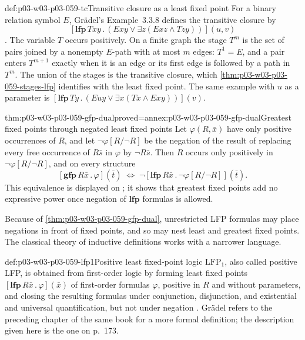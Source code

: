 \begin{hbexample}{def:p03-w03-p03-059-tc}{Transitive closure as a least fixed point}
For a binary relation symbol \(E\), Gr\"adel's Example~3.3.8 defines the
transitive closure by
\[
 [\mathbf{lfp}\,Txy\,.\,(Exy\lor\exists z(Exz\land Tzy))](u,v)
\]
\cite[p.~155]{Gradel2007FMTDescriptiveChapter}. The variable \(T\) occurs positively. On a
finite graph the stage \(T^m\) is the set of pairs joined by a nonempty
\(E\)-path with at most \(m\) edges: \(T^1=E\), and a pair enters
\(T^{m+1}\) exactly when it is an edge or its first edge is followed by a
path in \(T^m\). The union of the stages is the transitive closure, which
\cref{thm:p03-w03-p03-059-stages-lfp} identifies with the least fixed
point. The same example with \(u\) as a parameter is
\([\mathbf{lfp}\,Ty\,.\,(Euy\lor\exists x(Tx\land Exy))](v)\).
\end{hbexample}

\begin{hbtheorem}{thm:p03-w03-p03-059-gfp-dual}{proved=annex:p03-w03-p03-059-gfp-dual}{Greatest fixed points through negated least fixed points}
Let \(\varphi(R,\bar x)\) have only positive occurrences of \(R\), and let
\(\neg\varphi[R/\neg R]\) be the negation of the result of replacing every
free occurrence of \(R\bar s\) in \(\varphi\) by \(\neg R\bar s\). Then \(R\) occurs only
positively in \(\neg\varphi[R/\neg R]\), and on every structure
\[
 [\mathbf{gfp}\,R\bar x\,.\,\varphi](\bar t)
 \;\Leftrightarrow\;
 \neg[\mathbf{lfp}\,R\bar x\,.\,\neg\varphi[R/\neg R]](\bar t).
\]
This equivalence is displayed on \cite[p.~156]{Gradel2007FMTDescriptiveChapter}; it shows
that greatest fixed points add no expressive power once negation of
\(\mathbf{lfp}\) formulas is allowed.
\end{hbtheorem}

Because of \cref{thm:p03-w03-p03-059-gfp-dual}, unrestricted LFP formulas
may place negations in front of fixed points, and so may nest least and
greatest fixed points. The classical theory of inductive definitions works
with a narrower language.

\begin{hbdefinition}{def:p03-w03-p03-059-lfp1}{Positive least fixed-point logic}
\(\mathrm{LFP}_1\), also called positive LFP, is obtained from first-order
logic by forming least fixed points
\([\mathbf{lfp}\,R\bar x\,.\,\varphi](\bar x)\) of first-order formulas
\(\varphi\), positive in \(R\) and without parameters, and closing the
resulting formulas under conjunction, disjunction, and existential and
universal quantification, but not under negation
\cite[p.~173]{Gradel2007FMTDescriptiveChapter}. Gr\"adel refers to the preceding chapter
of the same book for a more formal definition; the description given here is
the one on p.~173.
\end{hbdefinition}

